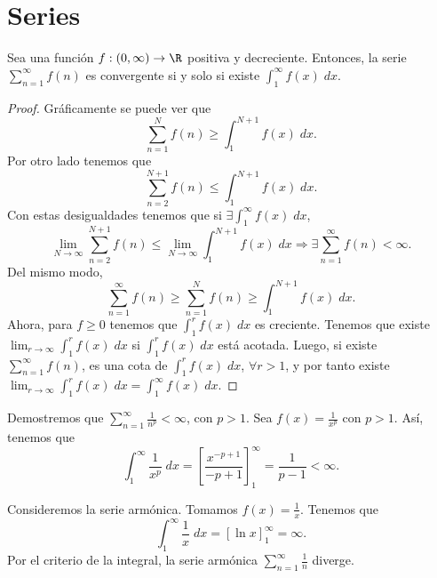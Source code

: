 \section{Series}
\begin{ftheorem}
\normalfont Sea una función $\displaystyle f : \left(0,\infty\right)\to \R $ positiva y decreciente. Entonces, la serie $\displaystyle \sum^{\infty}_{n=1}f\left(n\right) $ es convergente si y solo si existe $\displaystyle \int^{\infty}_{1} f\left(x\right) \; dx $.
\end{ftheorem}
\begin{proof}
Gráficamente se puede ver que
\[\sum^{N}_{n = 1}f\left(n\right) \geq \int^{N+1}_{1} f\left(x\right) \; dx .\]
Por otro lado tenemos que 
\[ \sum^{N+1}_{n = 2}f\left(n\right) \leq \int^{N+1}_{1} f\left(x\right) \; dx .\]
Con estas desigualdades tenemos que si $\displaystyle \exists \int^{\infty}_{1} f\left(x\right) \; dx $,
\[ \lim_{N \to \infty}\sum^{N+1}_{n = 2}f\left(n\right) \leq \lim_{N \to \infty}\int^{N+1}_{1} f\left(x\right) \; dx \Rightarrow \exists \sum^{\infty}_{n = 1}f\left(n\right) < \infty .\]
Del mismo modo, 
\[\sum^{\infty}_{n = 1}f\left(n\right) \geq \sum^{N}_{n = 1}f\left(n\right) \geq \int^{N+1}_{1} f\left(x\right) \; dx .\]
Ahora, para $\displaystyle f \geq 0 $ tenemos que $\displaystyle \int^{r}_{1} f\left(x\right) \; dx $ es creciente. Tenemos que existe $\displaystyle \lim_{r \to \infty}\int^{r}_{1} f\left(x\right) \; dx $ si $\displaystyle \int^{r}_{1} f\left(x\right) \; dx $ está acotada. Luego, si existe $\displaystyle \sum^{\infty}_{n = 1}f\left(n\right) $, es una cota de $\displaystyle \int^{r}_{1} f\left(x\right) \; dx $, $\displaystyle \forall r > 1 $, y por tanto existe $\displaystyle \lim_{r \to \infty}\int^{r}_{1} f\left(x\right) \; dx = \int^{\infty}_{1} f\left(x\right) \; dx $.
\end{proof}
\begin{eg}
\normalfont Demostremos que $\displaystyle \sum^{\infty}_{n = 1}\frac{1}{n^{p}} < \infty $, con $\displaystyle p > 1 $. Sea $\displaystyle f\left(x\right) = \frac{1}{x^{p}} $ con $\displaystyle p > 1 $. Así, tenemos que
\[ \int^{\infty}_{1} \frac{1}{x^{p}} \; dx = \left[\frac{x^{-p + 1}}{- p + 1}\right] ^{\infty}_{1} = \frac{1}{p - 1} < \infty.\]
\end{eg}
\begin{eg}
\normalfont Consideremos la serie armónica. Tomamos $\displaystyle f\left(x\right)= \frac{1}{x} $. Tenemos que 
\[\int^{\infty}_{1} \frac{1}{x} \; dx = \left[\ln x\right] ^{\infty}_{1} = \infty .\]
Por el criterio de la integral, la serie armónica $\displaystyle \sum^{\infty}_{n = 1}\frac{1}{n} $ diverge.
\end{eg}
